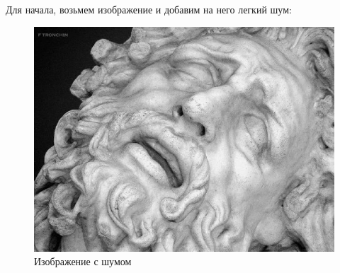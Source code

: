 \documentclass[14pt,a4paper,report]{report}
\begin{document}
Для начала, возьмем изображение и добавим на него легкий шум:
\begin{figure}[h!]
	\centering
	\includegraphics[scale = 0.6]{images/noise.jpg}
	\caption{Изображение с шумом}
\end{figure}
\end{document}
